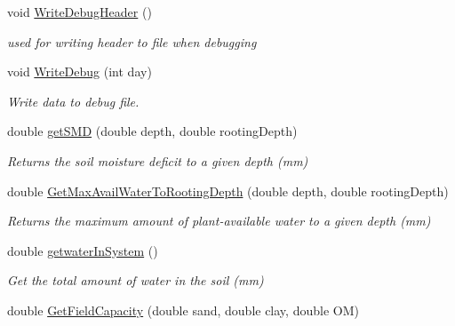 \begin{DoxyCompactItemize}
\mbox{\label{classsimplesoil_model_1_1simple_soil_a2c3168847b685c0972abc43cb71be993}} 
void \mbox{\hyperlink{classsimplesoil_model_1_1simple_soil_a2c3168847b685c0972abc43cb71be993}{Write\+Debug\+Header}} ()
\begin{DoxyCompactList}\small\item\em used for writing header to file when debugging \end{DoxyCompactList}\item 
\mbox{\label{classsimplesoil_model_1_1simple_soil_a082248ca3544715749dfa69649b1adee}} 
void \mbox{\hyperlink{classsimplesoil_model_1_1simple_soil_a082248ca3544715749dfa69649b1adee}{Write\+Debug}} (int day)
\begin{DoxyCompactList}\small\item\em Write data to debug file. \end{DoxyCompactList}\item 
double \mbox{\hyperlink{classsimplesoil_model_1_1simple_soil_a5ed67a8d25b44c463f586d3689296211}{get\+S\+MD}} (double depth, double rooting\+Depth)
\begin{DoxyCompactList}\small\item\em Returns the soil moisture deficit to a given depth (mm) \end{DoxyCompactList}\item 
double \mbox{\hyperlink{classsimplesoil_model_1_1simple_soil_a91b32d1ce3edeea34d86405ba9013c21}{Get\+Max\+Avail\+Water\+To\+Rooting\+Depth}} (double depth, double rooting\+Depth)
\begin{DoxyCompactList}\small\item\em Returns the maximum amount of plant-\/available water to a given depth (mm) \end{DoxyCompactList}\item 
\mbox{\label{classsimplesoil_model_1_1simple_soil_a28e0b5547e5728fee34db025abf7d9de}} 
double \mbox{\hyperlink{classsimplesoil_model_1_1simple_soil_a28e0b5547e5728fee34db025abf7d9de}{getwater\+In\+System}} ()
\begin{DoxyCompactList}\small\item\em Get the total amount of water in the soil (mm) \end{DoxyCompactList}\item 
double \mbox{\hyperlink{classsimplesoil_model_1_1simple_soil_a4ba9c7c0f072654666128bc23e3693a2}{Get\+Field\+Capacity}} (double sand, double clay, double OM)

\end{DoxyCompactItemize}
